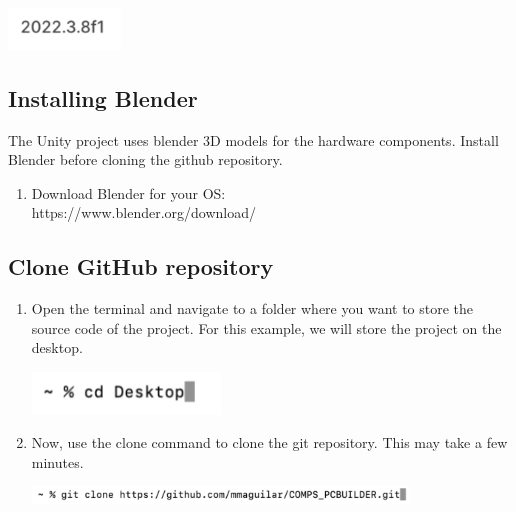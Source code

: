 \documentclass[10pt,twocolumn]{article}
\begin{document}
\begin{center}
    \includegraphics[width=3cm]{replication images/Version.png}
\end{center}

\subsection{Installing Blender}

The Unity project uses blender 3D models for the hardware components. Install Blender before cloning the github repository. 

\begin{enumerate}
    \item Download Blender for your OS: 
    \\https://www.blender.org/download/
\end{enumerate}

\subsection{Clone GitHub repository}
\begin{enumerate}
    \item Open the terminal and navigate to a folder where you want to store the source code of the project. For this example, we will store the project on the desktop. 
        
    \begin{center}
        \includegraphics[width=5cm]{replication images/cdDesktop.png}
    \end{center}

    \item Now, use the clone command to clone the git repository. This may take a few minutes.

    \begin{center}
        \includegraphics[width=10cm]{replication images/CloneCommand.png}
    \end{center}
    
\end{enumerate}
                       
\end{document}
